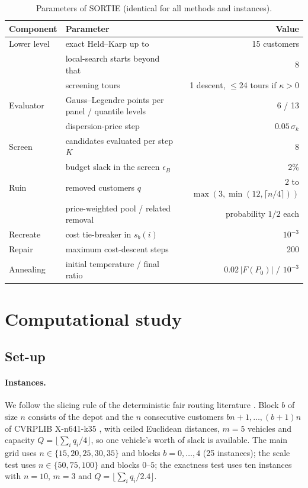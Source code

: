 \documentclass[11pt]{article}
\theoremstyle{definition}
\begin{document}
\begin{table}[t]\centering\small
\caption{Parameters of SORTIE (identical for all methods and instances).}\label{tab:params}
\begin{tabular}{llr}
\toprule
Component & Parameter & Value\\
\midrule
Lower level & exact Held--Karp up to & 15 customers\\
 & local-search starts beyond that & 8\\
 & screening tours & 1 descent, $\le$24 tours if $\kappa>0$\\
Evaluator & Gauss--Legendre points per panel / quantile levels & 6 / 13\\
 & dispersion-price step & $0.05\,\sigma_k$\\
Screen & candidates evaluated per step $K$ & 8\\
 & budget slack in the screen $\epsilon_B$ & 2\%\\
Ruin & removed customers $q$ & $2$ to $\max(3,\min(12,\lceil n/4\rceil))$\\
 & price-weighted pool / related removal & probability $1/2$ each\\
Recreate & cost tie-breaker in $s_b(i)$ & $10^{-3}$\\
Repair & maximum cost-descent steps & 200\\
Annealing & initial temperature / final ratio & $0.02\,|F(P_0)|$ / $10^{-3}$\\
\bottomrule
\end{tabular}
\end{table}

\section{Computational study}\label{sec:exp}

\subsection{Set-up}
\paragraph{Instances.} We follow the slicing rule of the deterministic fair
routing literature \citep{ljubic2026fair}. Block $b$ of size $n$ consists of the
depot and the $n$ consecutive customers $bn+1,\dots,(b+1)n$ of CVRPLIB
X-n641-k35 \citep{uchoa2017new}, with ceiled Euclidean distances, $m=5$
vehicles and capacity $Q=\lfloor\sum_i q_i/4\rfloor$, so one vehicle's worth
of slack is available. The main grid uses $n\in\{15,20,25,30,35\}$ and blocks
$b=0,\dots,4$ (25 instances); the scale test uses $n\in\{50,75,100\}$ and
blocks $0$--$5$; the exactness test uses ten instances with $n=10$, $m=3$ and
$Q=\lfloor\sum_i q_i/2.4\rfloor$.
\end{document}
